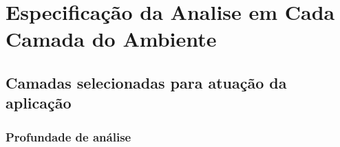 \section{Especificação da Analise em Cada Camada do Ambiente}

\subsection{Camadas selecionadas para atuação da aplicação}

\subsubsection{Profundade de análise}
